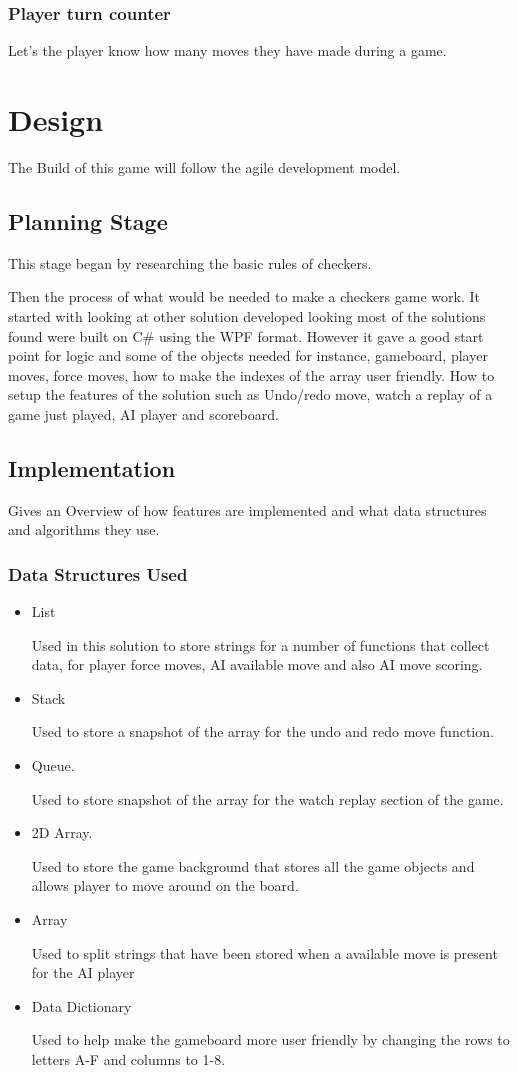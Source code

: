 \documentclass[10pt, a4paper]{article}
\begin{document}
\subsubsection  {Player turn counter}
	Let's the player know how many moves they have made during a game.

	\section{Design}
	The Build of this game will follow the agile development model.
	\subsection{Planning Stage}
	This stage began by researching the basic rules of checkers.\cite{Erik}

 	Then the process of what would be needed to make a checkers game work. It started with looking at other solution developed looking most of the solutions found were built on C\# using the WPF format\cite{Sample}. However it gave a good start point for logic and some of the objects needed for instance,  gameboard, player moves, force moves, how to make the indexes of the array user friendly. How to setup the features of the solution such as Undo/redo move, watch a replay of a game just played, AI player and scoreboard.  

	\subsection{Implementation}
	Gives an Overview of how features are implemented and what data structures and algorithms they use.
	\subsubsection{Data Structures Used}
	\begin{itemize}
	 \item List

Used in this solution to store strings for a number of functions that collect data, for player force moves, AI available move and also AI move scoring.
 	 \item Stack

Used to store a snapshot of the array for the undo and redo move function.
 	 \item Queue.

Used to store snapshot of the array for the watch replay section of the game.
 	 \item 2D Array.	

Used to store the game background that stores all the game objects and allows player to move around on the board.
	 \item Array

Used to split strings that have been stored when a available move is present for the AI player
	 \item Data Dictionary

Used to help make the gameboard more user friendly by changing the rows to letters A-F and columns to 1-8.   
	\end{itemize}	 
	
\end{document}
